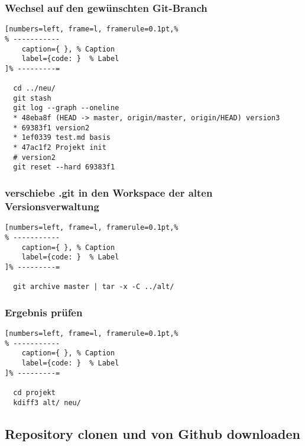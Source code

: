 \subsubsection{Wechsel auf den gewünschten
Git-Branch}\label{wechsel-auf-den-gewuenschten-git-branch}

\lstset{language=Bash} %
\begin{lstlisting}[numbers=left, frame=l, framerule=0.1pt,%
% -----------
	caption={ }, % Caption
	label={code: }  % Label
]% ---------=

  cd ../neu/
  git stash
  git log --graph --oneline
  * 48eba8f (HEAD -> master, origin/master, origin/HEAD) version3
  * 69383f1 version2
  * 1ef0339 test.md basis
  * 47ac1f2 Projekt init
  # version2
  git reset --hard 69383f1
\end{lstlisting}

\subsubsection{verschiebe .git in den Workspace der alten
Versionsverwaltung}\label{verschiebe-.git-in-den-workspace-der-alten-versionsverwaltung}

\lstset{language=Bash} %
\begin{lstlisting}[numbers=left, frame=l, framerule=0.1pt,%
% -----------
	caption={ }, % Caption
	label={code: }  % Label
]% ---------=

  git archive master | tar -x -C ../alt/
\end{lstlisting}

\subsubsection{Ergebnis prüfen}\label{ergebnis-pruefen}

\lstset{language=Bash} %
\begin{lstlisting}[numbers=left, frame=l, framerule=0.1pt,%
% -----------
	caption={ }, % Caption
	label={code: }  % Label
]% ---------=

  cd projekt
  kdiff3 alt/ neu/
\end{lstlisting}

\subsection{Repository clonen und von Github
downloaden}\label{repository-clonen-und-von-github-downloaden}


